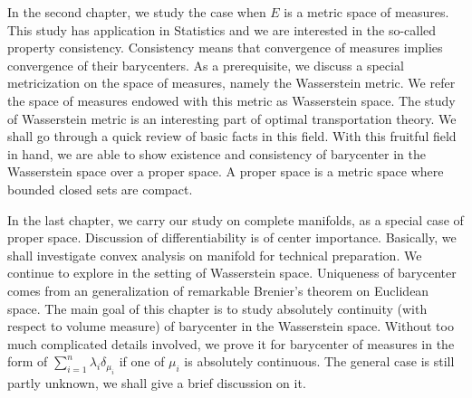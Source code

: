 In the second chapter, we study the case when $E$ is a metric space of measures.
This study has application in Statistics and we are interested in the so-called property consistency.
Consistency means that convergence of measures implies convergence of their barycenters.
As a prerequisite, we discuss a special metricization on the space of measures,
namely the Wasserstein metric.
We refer the space of measures endowed with this metric as Wasserstein space.
The study of Wasserstein metric is an interesting part of optimal transportation theory.
We shall go through a quick review of basic facts in this field.
With this fruitful field in hand,
we are able to show existence and consistency of barycenter in the Wasserstein space over a proper space.
A proper space is a metric space where bounded closed sets are compact.

In the last chapter, we carry our study on complete manifolds,
as a special case of proper space.
Discussion of differentiability is of center importance.
Basically, we shall investigate convex analysis on manifold for technical preparation.
We continue to explore in the setting of Wasserstein space.
Uniqueness of barycenter comes from an generalization of remarkable Brenier's theorem on Euclidean space.
The main goal of this chapter is to study absolutely continuity (with respect to volume measure) of barycenter in the Wasserstein space.
Without too much complicated details involved, we prove it for barycenter of measures in the form of
$\sum_{i=1}^{n} \lambda_i \delta_{\mu_i}$ if one of $\mu_i$ is absolutely continuous.
The general case is still partly unknown, we shall give a brief discussion on it.
